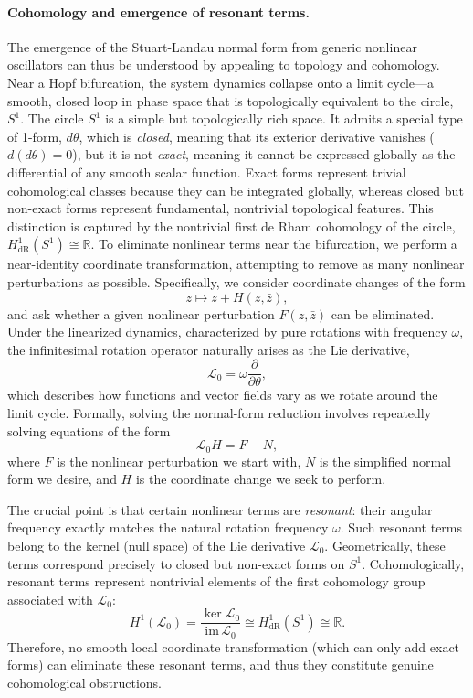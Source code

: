 \paragraph{Cohomology and emergence of resonant terms.} The emergence of the Stuart-Landau normal form from generic nonlinear oscillators can thus be understood by appealing to topology and cohomology. Near a Hopf bifurcation, the system dynamics collapse onto a limit cycle—a smooth, closed loop in phase space that is topologically equivalent to the circle, $S^1$.   The circle $S^1$ is a simple but topologically rich space. It admits a special type of 1-form, $d\theta$, which is \emph{closed}, meaning that its exterior derivative vanishes ($d(d\theta)=0$), but it is not \emph{exact}, meaning it cannot be expressed globally as the differential of any smooth scalar function. Exact forms represent trivial cohomological classes because they can be integrated globally, whereas closed but non-exact forms represent fundamental, nontrivial topological features. This distinction is captured by the nontrivial first de Rham cohomology of the circle, $
H^1_{\mathrm{dR}}(S^1)\cong \mathbb{R}.
$
To eliminate nonlinear terms near the bifurcation, we perform a near-identity coordinate transformation, attempting to remove as many nonlinear perturbations as possible. Specifically, we consider coordinate changes of the form
\[
z \mapsto z + H(z,\bar{z}),
\]
and ask whether a given nonlinear perturbation $F(z,\bar z)$ can be eliminated. Under the linearized dynamics, characterized by pure rotations with frequency $\omega$, the infinitesimal rotation operator naturally arises as the Lie derivative,
\[
\mathcal{L}_0 = \omega \frac{\partial}{\partial \theta},
\]
which describes how functions and vector fields vary as we rotate around the limit cycle. Formally, solving the normal-form reduction involves repeatedly solving equations of the form
\[
\mathcal{L}_0 H = F - N,
\]
where $F$ is the nonlinear perturbation we start with, $N$ is the simplified normal form we desire, and $H$ is the coordinate change we seek to perform.

The crucial point is that certain nonlinear terms are \emph{resonant}: their angular frequency exactly matches the natural rotation frequency $\omega$. Such resonant terms belong to the kernel (null space) of the Lie derivative $\mathcal{L}_0$. Geometrically, these terms correspond precisely to closed but non-exact forms on $S^1$. Cohomologically, resonant terms represent nontrivial elements of the first cohomology group associated with $\mathcal{L}_0$:
\[
H^1(\mathcal{L}_0)=\frac{\ker \mathcal{L}_0}{\mathrm{im}\,\mathcal{L}_0}\cong H^1_{\mathrm{dR}}(S^1)\cong \mathbb{R}.
\]
Therefore, no smooth local coordinate transformation (which can only add exact forms) can eliminate these resonant terms, and thus they constitute genuine cohomological obstructions.

